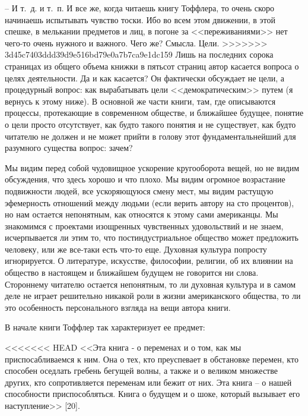 \documentclass{book}
\begin{document}
{-- И т.~д. и т.~п.
И все же, когда читаешь книгу Тоффлера, то очень скоро начинаешь испытывать чувство тоски. Ибо во всем этом движе­нии, в этой спешке, в мелькании предметов и лиц, в погоне за <<переживаниями>> нет чего-то очень нужного и важного. Чего же? Смысла. Цели.
>>>>>>> 3d45c7403ddd39d9e516bd79e0a7b7ca9e1dc159
Лишь на последних сорока страницах из общего объема книжки в пятьсот страниц автор касается вопроса о целях деятельности. Да и как касается? Он фактически обсуждает не цели, а  процедурный вопрос: как вырабатывать цели <<демократическим>> путем (я вернусь к этому ниже). В основной же части книги, там, где описываются процессы, протекающие в совре­менном обществе, и ближайшее будущее, понятие о цели просто отсутствует, как будто такого понятия и не существует, как будто читателю не должен и не может прийти в голову этот фундаментальнейший для разумного существа вопрос: зачем?

Мы видим перед собой чудовищное ускорение кругооборо­та вещей, но не видим обсуждения, что здесь хорошо и что пло­хо. Мы видим огромное возрастание подвижности людей, все ускоряющуюся смену мест, мы видим растущую эфемерность отношений между людьми (если верить автору на сто процен­тов), но нам остается непонятным, как относятся к этому са­ми американцы. Мы знакомимся с проектами изощренных чувственных удовольствий и не знаем, исчерпывается ли этим то, что постиндустриальное общество может предложить чело­веку, или же все-таки есть что-то еще. Духовная культура по­просту игнорируется. О литературе, искусстве, философии, ре­лигии, об их влиянии на общество в настоящем и ближайшем бу­дущем не говорится ни слова. Стороннему читателю остается не­понятным, то ли духовная культура и в самом деле не играет решительно никакой роли в жизни американского общества, то ли это особенность персонального взгляда на вещи автора книги.

В начале книги Тоффлер так характеризует ее предмет:

<<<<<<< HEAD
<<Эта книга ‑ о переменах и о том, как мы приспосабливаем­ся к ним. Она о тех, кто преуспевает в обстановке перемен, кто способен оседлать гребень бегущей волны, а также и о великом множестве других, кто сопротивляется переменам или бежит от них. Эта книга -- о нашей способности приспособляться. Книга о будущем и о шоке, который вызывает его наступле­ние>> [20].

}
\end{document}
